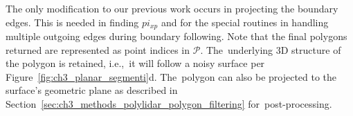 The only modification to our previous work occurs in projecting the boundary edges. This is needed in finding $pi_{xp}$ and for the special routines in handling multiple outgoing edges during boundary following.
Note that the final polygons returned are represented as point indices in $\mathcal{P}$. The~underlying 3D structure of the polygon is retained, i.e.,~it will follow a noisy surface per Figure~\ref{fig:ch3_planar_segmenti}d.  The~polygon can also be projected to the surface's geometric plane as described in Section~\ref{sec:ch3_methods_polylidar_polygon_filtering} for~post-processing.

